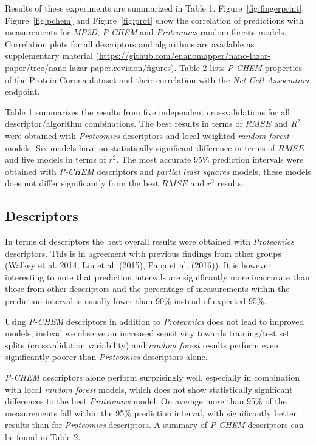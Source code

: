 \documentclass[utf8]{frontiersHLTH} %
\begin{document}
Results of these experiments are summarized in Table 1.
Figure~\ref{fig:fingerprint}, Figure~\ref{fig:pchem} and
Figure~\ref{fig:prot} show the correlation of predictions with
measurements for \emph{MP2D}, \emph{P-CHEM} and \emph{Proteomics} random
forests models. Correlation plots for all descriptors and algorithms are
available as supplementary material
(\url{https://github.com/enanomapper/nano-lazar-paper/tree/nano-lazar-paper.revision/figures}).
Table 2 lists \emph{P-CHEM} properties of the Protein Corona dataset and
their correlation with the \emph{Net Cell Association} endpoint.

Table 1 summarizes the results from five independent crossvalidations
for all descriptor/algorithm combinations. The best results in terms of
\(RMSE\) and \(R^2\) were obtained with \emph{Proteomics} descriptors
and local weighted \emph{random forest} models. Six models have no
statistically significant difference in terms of \(RMSE\) and five
models in terms of \(r^2\). The most accurate 95\% prediction intervals
were obtained with \emph{P-CHEM} descriptors and \emph{partial least
squares} models, these models does not differ significantly from the
best \(RMSE\) and \(r^2\) results.

\subsection{Descriptors}\label{descriptors}

In terms of descriptors the best overall results were obtained with
\emph{Proteomics} descriptors. This is in agreement with previous
findings from other groups (Walkey et al. 2014, Liu et al. (2015), Papa
et al. (2016)). It is however interesting to note that prediction
intervals are significantly more inaccurate than those from other
descriptors and the percentage of measurements within the prediction
interval is usually lower than 90\% instead of expected 95\%.

Using \emph{P-CHEM} descriptors in addition to \emph{Proteomics} does
not lead to improved models, instead we observe an increased sensitivity
towards training/test set splits (crossvalidation variability) and
\emph{random forest} results perform even significantly poorer than
\emph{Proteomics} descriptors alone.

\emph{P-CHEM} descriptors alone perform surprisingly well, especially in
combination with local \emph{random forest} models, which does not show
statistically significant differences to the best \emph{Proteomics}
model. On average more than 95\% of the measurements fall within the
95\% prediction interval, with significantly better results than for
\emph{Proteomics} descriptors. A summary of \emph{P-CHEM} descriptors
can be found in Table 2.
\end{document}
